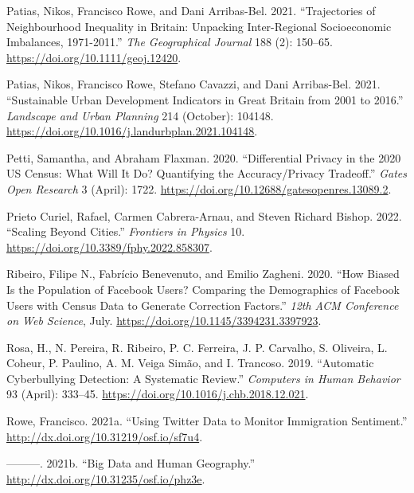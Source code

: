 \documentclass[
  letterpaper,
  DIV=11,
  numbers=noendperiod]{scrreprt}
\newlength{\cslhangindent}
\newlength{\cslentryspacingunit} %
\newenvironment{CSLReferences}[2] %
 {%
  \setlength{\parindent}{0pt}
  \ifodd #1
  \let\oldpar\par
  \def\par{\hangindent=\cslhangindent\oldpar}
  \fi
  \setlength{\parskip}{#2\cslentryspacingunit}
 }%
 {}
\begin{document}
\begin{CSLReferences}{1}{0}
\leavevmode{}%
Patias, Nikos, Francisco Rowe, and Dani Arribas-Bel. 2021.
{``Trajectories of Neighbourhood Inequality in Britain: Unpacking
Inter{-}Regional Socioeconomic Imbalances, 1971{-}2011.''} \emph{The
Geographical Journal} 188 (2): 150--65.
\url{https://doi.org/10.1111/geoj.12420}.

\leavevmode{}%
Patias, Nikos, Francisco Rowe, Stefano Cavazzi, and Dani Arribas-Bel.
2021. {``Sustainable Urban Development Indicators in Great Britain from
2001 to 2016.''} \emph{Landscape and Urban Planning} 214 (October):
104148. \url{https://doi.org/10.1016/j.landurbplan.2021.104148}.

\leavevmode{}%
Petti, Samantha, and Abraham Flaxman. 2020. {``Differential Privacy in
the 2020 US Census: What Will It Do? Quantifying the Accuracy/Privacy
Tradeoff.''} \emph{Gates Open Research} 3 (April): 1722.
\url{https://doi.org/10.12688/gatesopenres.13089.2}.

\leavevmode{}%
Prieto Curiel, Rafael, Carmen Cabrera-Arnau, and Steven Richard Bishop.
2022. {``Scaling Beyond Cities.''} \emph{Frontiers in Physics} 10.
\url{https://doi.org/10.3389/fphy.2022.858307}.

\leavevmode{}%
Ribeiro, Filipe N., Fabrício Benevenuto, and Emilio Zagheni. 2020.
{``How Biased Is the Population of Facebook Users? Comparing the
Demographics of Facebook Users with Census Data to Generate Correction
Factors.''} \emph{12th ACM Conference on Web Science}, July.
\url{https://doi.org/10.1145/3394231.3397923}.

\leavevmode{}%
Rosa, H., N. Pereira, R. Ribeiro, P. C. Ferreira, J. P. Carvalho, S.
Oliveira, L. Coheur, P. Paulino, A. M. Veiga Simão, and I. Trancoso.
2019. {``Automatic Cyberbullying Detection: A Systematic Review.''}
\emph{Computers in Human Behavior} 93 (April): 333--45.
\url{https://doi.org/10.1016/j.chb.2018.12.021}.

\leavevmode{}%
Rowe, Francisco. 2021a. {``Using Twitter Data to Monitor Immigration
Sentiment.''} \url{http://dx.doi.org/10.31219/osf.io/sf7u4}.

\leavevmode{}%
---------. 2021b. {``Big Data and Human Geography.''}
\url{http://dx.doi.org/10.31235/osf.io/phz3e}.


\end{CSLReferences}
\end{document}
